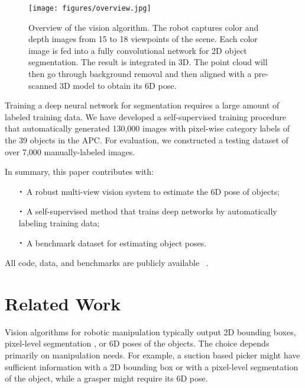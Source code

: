 \documentclass[letterpaper, 10 pt, conference]{ieeeconf}  %
\newcommand*{\Cdot}{\raisebox{-0.25ex}{\scalebox{1.75}{$\cdot$}}}
\begin{document}
\begin{figure*}[t]
\vspace{2mm}
\centering
  \texttt{[image: figures/overview.jpg]}
  \caption{Overview of the vision algorithm. The robot captures color and depth images from 15 to 18 viewpoints of the scene. Each color image is fed into a fully convolutional network \cite{long2015fully} for 2D object segmentation. The result is integrated in 3D. The point cloud will then go through background removal and then aligned with a pre-scanned 3D model to obtain its 6D pose.}
  \label{fig:overview}
\end{figure*}

Training a deep neural network for segmentation requires a large amount of labeled training data. We have developed a self-supervised training procedure that automatically generated 130,000 images with pixel-wise category labels of the 39 objects in the APC. For evaluation, we constructed a testing dataset of over 7,000 manually-labeled images. 

In summary, this paper contributes with:
%
\begin{itemize}
\item[$\Cdot$] A robust multi-view vision system to estimate the 6D pose of objects;
\item[$\Cdot$] A self-supervised method that trains deep networks by automatically labeling training data; 
\item[$\Cdot$] A benchmark dataset for estimating object poses. \end{itemize}
%
All code, data, and benchmarks are publicly available~ \cite{projectwebsite}.



\section{Related Work}
\label{sec:RelatedWork}
Vision algorithms for robotic manipulation typically output 2D bounding boxes, pixel-level segmentation \cite{jonschkowski2016probabilistic, rbolessons}, or 6D poses \cite{zhang2016dorapicker, yuapc2015} of the objects.
The choice depends primarily on manipulation needs. For example, a suction based picker might have sufficient information with a 2D bounding box or with a pixel-level segmentation of the object, while a grasper might require its 6D pose. %
\end{document}
